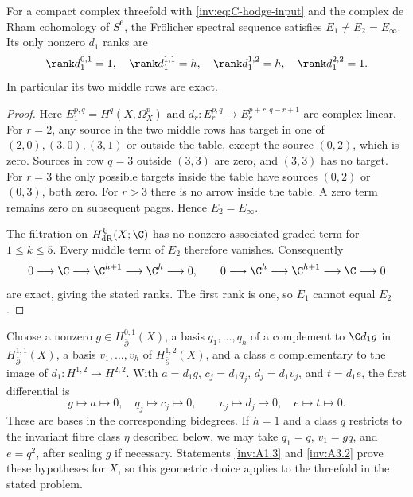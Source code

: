 \begin{proposition}\label{inv:C1.1}\label{wb:thm:frolicher-e2-candidate}
For a compact complex threefold with \eqref{inv:eq:C-hodge-input} and the
complex de Rham cohomology of $S^6$, the Fr\"olicher spectral sequence
satisfies $E_1\ne E_2=E_\infty$.  Its only nonzero $d_1$ ranks are
\[
\rank d_1^{0,1}=1,\quad \rank d_1^{1,1}=h,\quad
\rank d_1^{1,2}=h,\quad \rank d_1^{2,2}=1.
\]
In particular its two middle rows are exact.
\end{proposition}

\begin{proof}
Here $E_1^{p,q}=H^q(X,\Omega_X^p)$ and
$d_r:E_r^{p,q}\longrightarrow E_r^{p+r,q-r+1}$ are complex-linear.
For $r=2$, any source in the two middle rows has target in one of
$(2,0),(3,0),(3,1)$ or outside the table, except the source $(0,2)$,
which is zero.  Sources in row $q=3$ outside $(3,3)$ are zero, and
$(3,3)$ has no target.  For $r=3$ the only possible targets inside the
table have sources $(0,2)$ or $(0,3)$, both zero.  For $r>3$ there is
no arrow inside the table.  A zero term remains zero on subsequent
pages.  Hence $E_2=E_\infty$.

The filtration on $H^k_{\mathrm{dR}}(X;\C)$ has no nonzero associated
graded term for $1\le k\le5$.  Every middle term of $E_2$ therefore
vanishes.  Consequently
\[
0\longrightarrow\C\longrightarrow\C^{h+1}
\longrightarrow\C^h\longrightarrow0,
\qquad
0\longrightarrow\C^h\longrightarrow\C^{h+1}
\longrightarrow\C\longrightarrow0
\]
are exact, giving the stated ranks.  The first rank is one, so $E_1$
cannot equal $E_2$.
\end{proof}

\begin{proposition}\label{inv:C1.2}
Choose a nonzero $g\in H^{0,1}_{\bar\partial}(X)$, a basis
$q_1,\ldots,q_h$ of a complement to $\C d_1g$ in
$H^{1,1}_{\bar\partial}(X)$, a basis $v_1,\ldots,v_h$ of
$H^{1,2}_{\bar\partial}(X)$, and a class $e$ complementary to the
image of $d_1:H^{1,2}\to H^{2,2}$.  With
$a=d_1g$, $c_j=d_1q_j$, $d_j=d_1v_j$, and $t=d_1e$, the first
differential is
\[
g\mapsto a\mapsto0,\quad q_j\mapsto c_j\mapsto0,
\qquad v_j\mapsto d_j\mapsto0,\quad e\mapsto t\mapsto0.
\]
These are bases in the corresponding bidegrees.  If $h=1$ and a
class $q$ restricts to the invariant fibre class $\eta$ described below,
we may take $q_1=q$, $v_1=gq$, and $e=q^2$, after scaling $g$ if
necessary.  Statements \ref{inv:A1.3} and \ref{inv:A3.2} prove these hypotheses for $X$,
so this geometric choice applies to the threefold in the stated problem.
\end{proposition}

